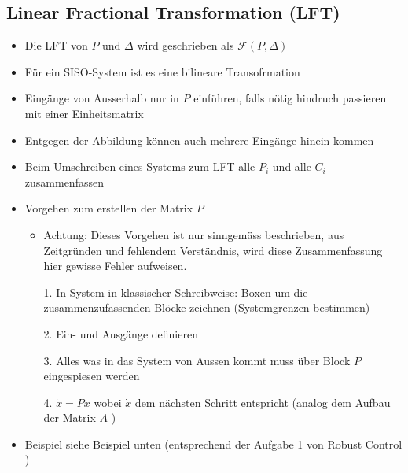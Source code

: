 \subsection{Linear Fractional Transformation (LFT)}
\begin{itemize}
	\item Die LFT von $P$ und $\Delta$ wird geschrieben als $\mathcal{F}\left(P,\Delta\right)$
	\item Für ein SISO-System ist es eine bilineare Transofrmation
	\item Eingänge von Ausserhalb nur in $P$ einführen, falls nötig hindruch passieren mit einer Einheitsmatrix
	\item Entgegen der Abbildung können auch mehrere Eingänge hinein kommen
	\item Beim Umschreiben eines Systems zum LFT alle $P_i$ und alle $C_i$ zusammenfassen
	\item Vorgehen zum erstellen der Matrix $P$
	\begin{itemize}
		\item Achtung: Dieses Vorgehen ist nur sinngemäss beschrieben, aus Zeitgründen und fehlendem Verständnis, wird diese Zusammenfassung hier gewisse Fehler aufweisen. 
		\item [1.] In System in klassischer Schreibweise: Boxen um die zusammenzufassenden Blöcke zeichnen (Systemgrenzen bestimmen)
		\item [2.] Ein- und Ausgänge definieren 
		\item [3.] Alles was in das System von Aussen kommt muss über Block $P$ eingespiesen werden
		\item [4.] $\dot{x} = Px$ wobei $\dot{x}$ dem nächsten Schritt entspricht (analog dem Aufbau der Matrix $A$ )
	\end{itemize}
	\item Beispiel siehe Beispiel unten (entsprechend der Aufgabe 1 von \glqq Robust Control \grqq)
\end{itemize}


